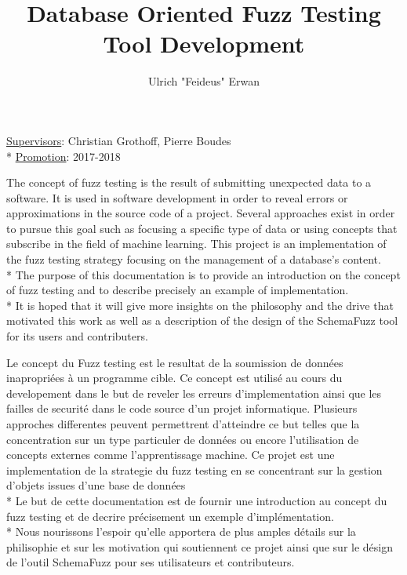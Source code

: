 \documentclass{article}
\title{Database Oriented Fuzz Testing Tool Development}
\author{Ulrich "Feideus" Erwan}
\newcommand\tab[1][1cm]{\hspace*{#1}}
\begin{document}
\begin{empfile}

\maketitle

\vspace*{\fill}
\underline{Supervisors}: Christian Grothoff, Pierre Boudes 	\\*
\tab[0.4cm] \underline{Promotion}: 2017-2018
\clearpage

\tableofcontents
\clearpage

	\abstract
The concept of fuzz testing is the result of submitting unexpected data to a software. It is used in software development in order to reveal errors or approximations in the source code of a project. Several approaches exist in order to pursue this goal such as focusing a specific type of data or using concepts that subscribe in the field of machine learning. This project is an implementation of the fuzz testing strategy focusing on the management of a database's content.  \\*
The purpose of this documentation is to provide an introduction on the concept of fuzz testing and to describe precisely an example of implementation. \\*
It is hoped that it will give more insights on the philosophy and the drive that motivated this work as well as a description of the design of the SchemaFuzz tool for its users and contributers.

\bigskip

Le concept du Fuzz testing est le resultat de la soumission de données inapropriées à un programme cible. Ce concept est utilisé au cours du developement dans le but de reveler les erreurs d'implementation ainsi que les failles de securité dans le code source d'un projet informatique. Plusieurs approches differentes peuvent permettrent d'atteindre ce but telles que la concentration sur un type particuler de données ou encore l'utilisation de concepts externes comme l'apprentissage machine. Ce projet est une implementation de la strategie du fuzz testing en se concentrant sur la gestion d'objets issues d'une base de données \\*
Le but de cette documentation est de fournir une introduction au concept du fuzz testing et de decrire précisement un exemple d'implémentation. \\*
Nous nourissons l'espoir qu'elle apportera de plus amples détails sur la philisophie et sur les motivation qui soutiennent ce projet ainsi que sur le désign de l'outil SchemaFuzz pour ses utilisateurs et contributeurs. 


\end{empfile}
\end{document}
